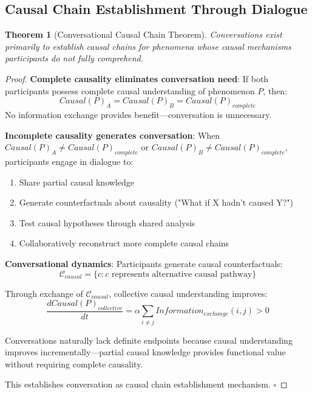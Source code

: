 \documentclass[12pt]{article}
\newtheorem{theorem}{Theorem}[section]
\theoremstyle{definition}
\theoremstyle{remark}
\begin{document}
\subsection{Causal Chain Establishment Through Dialogue}

\begin{theorem}[Conversational Causal Chain Theorem]
\label{thm:causal_chain}
Conversations exist primarily to establish causal chains for phenomena whose causal mechanisms participants do not fully comprehend.
\end{theorem}

\begin{proof}
\textbf{Complete causality eliminates conversation need}: If both participants possess complete causal understanding of phenomenon $P$, then:
\begin{equation}
Causal(P)_A = Causal(P)_B = Causal(P)_{complete}
\end{equation}
No information exchange provides benefit—conversation is unnecessary.

\textbf{Incomplete causality generates conversation}: When $Causal(P)_A \neq Causal(P)_{complete}$ or $Causal(P)_B \neq Causal(P)_{complete}$, participants engage in dialogue to:
\begin{enumerate}
\item Share partial causal knowledge
\item Generate counterfactuals about causality ("What if X hadn't caused Y?")
\item Test causal hypotheses through shared analysis
\item Collaboratively reconstruct more complete causal chains
\end{enumerate}

\textbf{Conversational dynamics}: Participants generate causal counterfactuals:
\begin{equation}
\mathcal{C}_{causal} = \{c : c \text{ represents alternative causal pathway}\}
\end{equation}

Through exchange of $\mathcal{C}_{causal}$, collective causal understanding improves:
\begin{equation}
\frac{d Causal(P)_{collective}}{dt} = \alpha \sum_{i \neq j} Information_{exchange}(i,j) > 0
\end{equation}

Conversations naturally lack definite endpoints because causal understanding improves incrementally—partial causal knowledge provides functional value without requiring complete causality.

This establishes conversation as causal chain establishment mechanism. $\square$
\end{proof}
\end{document}
